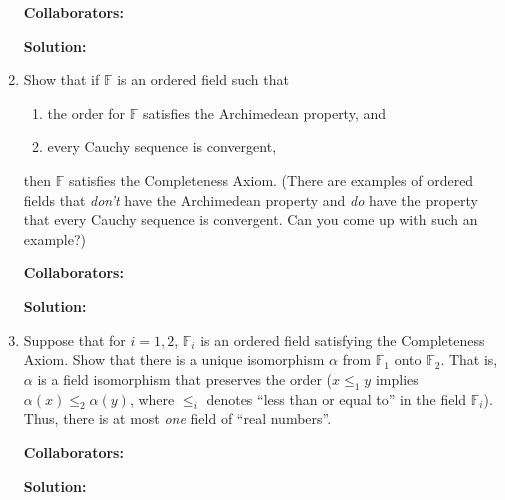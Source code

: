 \documentclass{article}%
\begin{document}
\begin{enumerate}
\bigskip
\textbf{Collaborators:}\\
\smallskip
 
\textbf{Solution:}
\bigskip


\item Show that if $\mathbb{F}$ is an ordered field such that
\begin{enumerate}
\item the order for $\mathbb{F}$ satisfies the Archimedean property, and
\item every Cauchy sequence is convergent, 
\end{enumerate}
then $\mathbb{F}$ satisfies the Completeness Axiom. (There are examples of ordered fields that \emph{don't} have the Archimedean property and \emph{do} have the property that every Cauchy sequence is convergent.  Can you come up with such an example?)


\bigskip
\textbf{Collaborators:}\\
\smallskip
 
\textbf{Solution:} \\

\bigskip


\item Suppose that for $i = 1,2$, $\mathbb{F}_i$ is an ordered field satisfying the Completeness Axiom. Show that there is a unique isomorphism $\alpha$ from $\mathbb{F}_1$ onto $\mathbb{F}_2$. That is, $\alpha$ is a field isomorphism that preserves the order ($x \leq_1 y$ implies $\alpha(x) \leq_2 \alpha(y)$, where $\leq_i$ denotes ``less than or equal to'' in the field $\mathbb{F}_i$). Thus, there is at most \emph{one} field of ``real numbers''. 


\bigskip
\textbf{Collaborators:}\\
\smallskip
 
\textbf{Solution:}
\bigskip


\end{enumerate}
\end{document}
